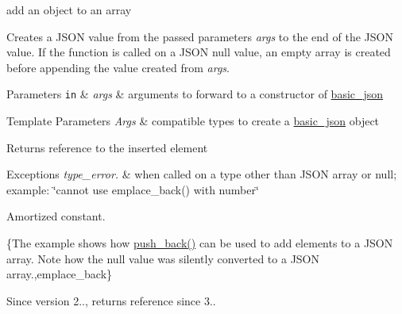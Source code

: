 add an object to an array 

Creates a J\+S\+ON value from the passed parameters {\itshape args} to the end of the J\+S\+ON value. If the function is called on a J\+S\+ON null value, an empty array is created before appending the value created from {\itshape args}.


\begin{DoxyParams}[1]{Parameters}
\mbox{\tt in}  & {\em args} & arguments to forward to a constructor of \mbox{\hyperlink{classnlohmann_1_1basic__json}{basic\+\_\+json}} \\
\hline
\end{DoxyParams}

\begin{DoxyTemplParams}{Template Parameters}
{\em Args} & compatible types to create a \mbox{\hyperlink{classnlohmann_1_1basic__json}{basic\+\_\+json}} object\\
\hline
\end{DoxyTemplParams}
\begin{DoxyReturn}{Returns}
reference to the inserted element
\end{DoxyReturn}

\begin{DoxyExceptions}{Exceptions}
{\em type\+\_\+error.} & when called on a type other than J\+S\+ON array or null; example\+: {\ttfamily \char`\"{}cannot use emplace\+\_\+back() with number\char`\"{}}\\
\hline
\end{DoxyExceptions}
Amortized constant.

\{The example shows how {\ttfamily \mbox{\hyperlink{classnlohmann_1_1basic__json_ac8e523ddc8c2dd7e5d2daf0d49a9c0d7}{push\+\_\+back()}}} can be used to add elements to a J\+S\+ON array. Note how the {\ttfamily null} value was silently converted to a J\+S\+ON array.,emplace\+\_\+back\}

\begin{DoxySince}{Since}
version 2.., returns reference since 3.. 
\end{DoxySince}
\mbox{\label{classnlohmann_1_1basic__json_a1a86d444bfeaa9518d2421aedd74444a}} 
